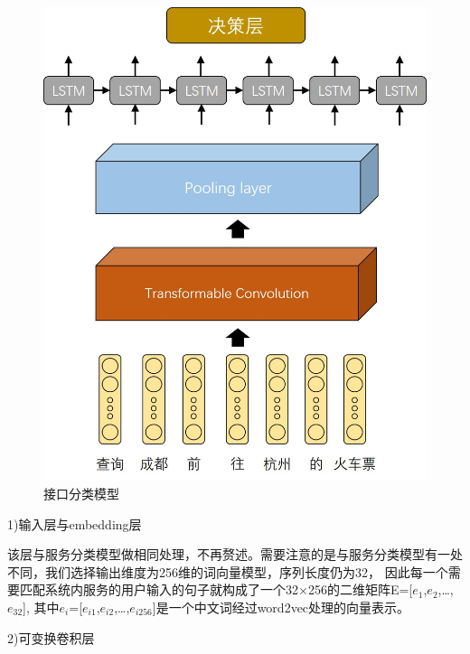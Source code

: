 \begin{figure}[htbp]
  \centering
  \includegraphics[scale=0.4]{./images/tran-cnn-lstm.jpg}
  \caption{接口分类模型}
  \label{fig:tran-cnn-lstm}
\end{figure}

1)输入层与embedding层

该层与服务分类模型做相同处理，不再赘述。需要注意的是与服务分类模型有一处不同，我们选择输出维度为256维的词向量模型，序列长度仍为32，
因此每一个需要匹配系统内服务的用户输入的句子就构成了一个32×256的二维矩阵E=[$e_{1}$,$e_{2}$,\dots,$e_{32}$],
其中$e_{i}$=[$e_{i1}$,$e_{i2}$,\dots,$e_{i256}$]是一个中文词经过word2vec处理的向量表示。


2)可变换卷积层

